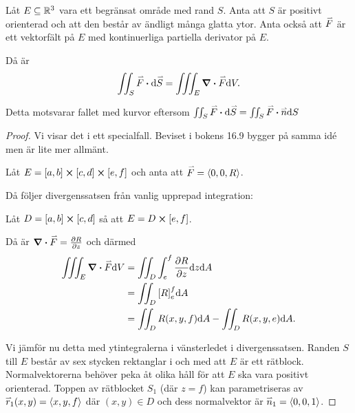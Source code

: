 \documentclass[a4paper]{article}
\begin{document}
\begin{sats}[Divergenssatsen]
    Låt \(
        E \subseteq \mathbb{R}^3
    \) vara ett begränsat område med rand \(
        S
    \). Anta att \(
        S
    \) är positivt orienterad och att den består av ändligt många glatta ytor. 
    Anta också att \(
        \accentset{\rightharpoonup}{F}
    \) är ett vektorfält på \(
        E
    \) med kontinuerliga partiella derivator på \(
        E
    \). 

    Då är \[
        \iint_S \vef \sprod \dd \ve{S} = \iiint_E \div{\vef} \dd V.
    \] 

    Detta motsvarar fallet med kurvor eftersom \(
        \iint_S \vef \sprod \dd \ve{S} = \iint_S \vef \sprod \ven \dd S
    \) 

    \begin{proof}
        Vi visar det i ett specialfall. Beviset i bokens 16.9 bygger på samma idé
        men är lite mer allmänt.

        Låt \(
            E = [a,b] \crossproduct [c,d] \crossproduct [e,f]
        \) och anta att \(
            \accentset{\rightharpoonup}{F} = \left\langle 0,0,R\right\rangle
        \).

        Då följer divergenssatsen från vanlig upprepad integration:

        Låt \(
            D = [a,b] \cprod [c,d]
        \) så att \(
            E = D \cprod [e,f]
        \).

        Då är \(
            \div{\accentset{\rightharpoonup}{F}} = \pdv{R}{z}
        \) och därmed 
        \begin{align*}
            \iiint_E \div{\accentset{\rightharpoonup}{F}} \dd V &= \iint_D \int_e^f \pdv{R}{z} \dd z \dd A \\
                &= \iint_D \qty[R]_e^f \dd A \\
                &= \iint_D R(x,y,f) \dd A - \iint_D R(x,y,e) \dd A.
        \end{align*}

        Vi jämför nu detta med ytintegralerna i vänsterledet i divergenssatsen.
        Randen \(
            S
        \) till \(
            E
        \) består av sex stycken rektanglar i och med att \(
            E
        \) är ett rätblock. Normalvektorerna behöver peka åt olika håll för att \(
            E
        \) ska vara positivt orienterad. Toppen av rätblocket \(
            S_1
        \) (där \(
            z = f
        \)) kan parametriseras av \(
            \accentset{\rightharpoonup}{r}_1(x,y) = \left\langle x,y,f\right\rangle
        \) där \(
            (x,y) \in D
        \) och dess normalvektor är \(
            \accentset{\rightharpoonup}{n}_1 = \left\langle 0,0,1\right\rangle
        \).


\end{proof}
\end{sats}
\end{document}
